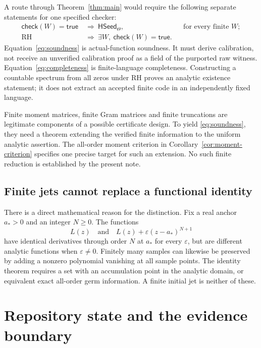\documentclass[11pt,a4paper]{article}
\numberwithin{equation}{section}
\theoremstyle{definition}
\theoremstyle{remark}
\newcommand{\RH}{\mathrm{RH}}
\newcommand{\HSeed}{\mathsf{HSeed}_{\Theta}}
\begin{document}
A route through Theorem~\ref{thm:main} would require the following
separate statements for one specified checker:
\begin{align}
\mathsf{check}(W)=\mathsf{true}&\ \Longrightarrow\ \HSeed,
&&\text{for every finite }W;\label{eq:soundness}\\
\RH&\ \Longrightarrow\ \exists W,\ \mathsf{check}(W)=\mathsf{true}.
&&\label{eq:completeness}
\end{align}
Equation~\eqref{eq:soundness} is actual-function soundness. It must
derive calibration, not receive an unverified calibration proof as a
field of the purported raw witness. Equation~\eqref{eq:completeness}
is finite-language completeness. Constructing a countable spectrum
from all zeros under RH proves an analytic existence statement; it
does not extract an accepted finite code in an independently fixed
language.

Finite moment matrices, finite Gram matrices and finite truncations
are legitimate components of a possible certificate design. To yield
\eqref{eq:soundness}, they need a theorem extending the verified finite
information to the uniform analytic assertion. The all-order moment
criterion in Corollary~\ref{cor:moment-criterion} specifies one precise
target for such an extension. No such finite reduction is established
by the present note.

\subsection{Finite jets cannot replace a functional identity}

There is a direct mathematical reason for the distinction. Fix a
real anchor $a_*>0$ and an integer $N\geq0$. The functions
\[
L(z)\quad\text{and}\quad L(z)+\varepsilon(z-a_*)^{N+1}
\]
have identical derivatives through order $N$ at $a_*$ for every
$\varepsilon$, but are different analytic functions when
$\varepsilon\ne0$. Finitely many samples can likewise be preserved by
adding a nonzero polynomial vanishing at all sample points.
The identity theorem requires a set with an accumulation point in
the analytic domain, or equivalent exact all-order germ information.
A finite initial jet is neither of these.

\section[Repository and evidence]{Repository state and the evidence boundary}\label{sec:repository}
\end{document}
